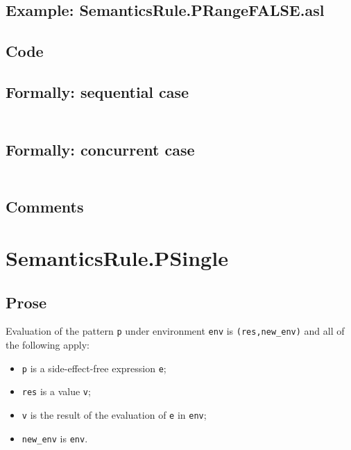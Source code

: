 \documentclass{book}
\begin{document}
    \subsection{Example: SemanticsRule.PRangeFALSE.asl}

  \subsection{Code}

  \subsection{Formally: sequential case}
  \begin{align}
  \end{align} 

  \subsection{Formally: concurrent case}
  \begin{align}
  \end{align} 

    \subsection{Comments}

\section{SemanticsRule.PSingle \label{sec:SemanticsRule.PSingle}}

    \subsection{Prose}
   Evaluation of the pattern \texttt{p} under environment \texttt{env} is
  \texttt{(res,new\_env)} and all of the following apply:
    \begin{itemize}
    \item \texttt{p} is a side-effect-free expression \texttt{e};
    \item \texttt{res} is a value \texttt{v};
    \item \texttt{v} is the result of the evaluation of \texttt{e} in \texttt{env};
    \item \texttt{new\_env} is \texttt{env}.
    \end{itemize}
\end{document}
